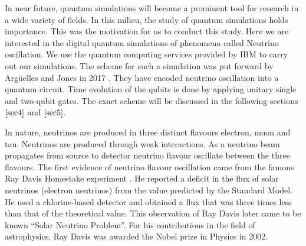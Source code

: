 \documentclass[12pt,a4paper]{report}
\begin{document}
In near future, quantum simulations will become a prominent tool for research in a wide variety of fields. In this milieu, the study of quantum simulations holds importance. This was the motivation for us to conduct this study. Here we are interested in the digital quantum simulations of phenomena called Neutrino oscillation. We use the quantum computing services provided by IBM to carry out our simulations. The scheme for such a simulation was put forward by Arg\"uelles and Jones in 2017 \cite{jones}. They have encoded neutrino oscillation into a quantum circuit. Time evolution of the qubits is done by applying unitary single and two-qubit gates. The exact scheme will be discussed in the following sections $\ref{sec4}$ and $\ref{sec5}$. 

In nature, neutrinos are produced in three distinct flavours electron, muon and tau. Neutrinos are produced through weak interactions. As a neutrino beam propagates from source to detector neutrino flavour oscillate between the three flavours. The first evidence of neutrino flavour oscillation came from the famous Ray Davis Homestake experiment \cite{ray}.  He reported a deficit in the flux of solar neutrinos (electron neutrinos)  from the value predicted by the Standard Model. He used a chlorine-based detector and obtained a flux that was three times less than that of the theoretical value.  This observation of Ray Davis later came to be known “Solar Neutrino Problem”. For his contributions in the field of astrophysics, Ray Davis was awarded the Nobel prize in Physics in 2002. 
\end{document}
